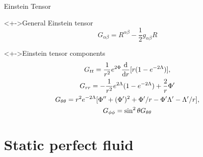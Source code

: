 \documentclass{beamer}
\let\svthefootnote\thefootnote
\newcommand\blankfootnote[1]{%
  \let\thefootnote\relax\footnotetext{#1}%
  \let\thefootnote\svthefootnote%
}
\begin{document}
\begin{frame}{Einstein Tensor}

\begin{block}<+->{General Einstein tensor}
\begin{displaymath}
  G_{\alpha\beta} = R^{\alpha\beta} - \frac{1}{2} g_{\alpha\beta} R
\end{displaymath}
\end{block}

\begin{block}<+->{Einstein tensor components}
\begin{gather*}
  G_{tt} =
  \frac{1}{r^2} e^{2\Phi} \dv{r} [r (1 - e^{-2\Lambda})],
  \\
  G_{rr} =
  -\frac{1}{r^2} e^{2\Lambda} (1 - e^{-2\Lambda}) + \frac{2}{r} \Phi'
  \\
  G_{\theta\theta} =
  r^2 e^{-2\Lambda} [\Phi'' + (\Phi')^2 + \Phi' / r - \Phi' \Lambda' - \Lambda' / r],
  \\
  G_{\phi\phi} =
  \sin^2\theta G_{\theta\theta}
\end{gather*}
\end{block}

\blankfootnote{\textcite[pp. 165, 260]{Schutz}}



\end{frame}


\section{Static perfect fluid}
\end{document}
